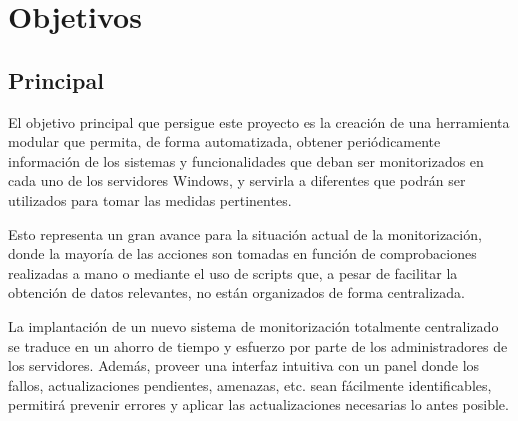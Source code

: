 
\section{Objetivos} \label{sec:obj}
    \subsection{Principal}
        El objetivo principal que persigue este proyecto es la creación de una herramienta modular que permita, de forma automatizada, obtener periódicamente información de los sistemas y funcionalidades que deban ser monitorizados en cada uno de los servidores Windows, y servirla a diferentes  que podrán ser utilizados para tomar las medidas pertinentes.
        
        Esto representa un gran avance para la situación actual de la monitorización, donde la mayoría de las acciones son tomadas en función de comprobaciones realizadas a mano o mediante el uso de scripts que, a pesar de facilitar la obtención de datos relevantes, no están organizados de forma centralizada.
        
        La implantación de un nuevo sistema de monitorización totalmente centralizado se traduce en un ahorro de tiempo y esfuerzo por parte de los administradores de los servidores. Además, proveer una interfaz intuitiva con un panel donde los fallos, actualizaciones pendientes, amenazas, etc. sean fácilmente identificables, permitirá prevenir errores y aplicar las actualizaciones necesarias lo antes posible.
        

